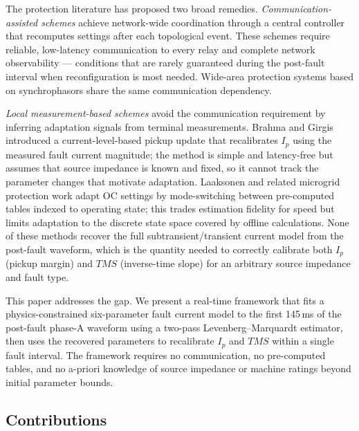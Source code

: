 \documentclass[journal, twoside, 10pt]{IEEEtran}
\begin{document}
The protection literature has proposed two broad remedies.
\emph{Communication-assisted schemes} \cite{Oudalov2009,Saleh2017} achieve
network-wide coordination through a central controller that recomputes settings
after each topological event.  These schemes require reliable, low-latency
communication to every relay and complete network observability --- conditions
that are rarely guaranteed during the post-fault interval when reconfiguration
is most needed.  Wide-area protection systems based on synchrophasors
\cite{Kundur1994} share the same communication dependency.

\emph{Local measurement-based schemes} avoid the communication requirement by
inferring adaptation signals from terminal measurements.  Brahma and Girgis
\cite{Brahma2004} introduced a current-level-based pickup update that recalibrates
$I_p$ using the measured fault current magnitude; the method is simple and
latency-free but assumes that source impedance is known and fixed, so it cannot
track the parameter changes that motivate adaptation.  Laaksonen
\cite{Laaksonen2017} and related microgrid protection work adapt OC settings
by mode-switching between pre-computed tables indexed to operating state; this
trades estimation fidelity for speed but limits adaptation to the discrete
state space covered by offline calculations.  None of these methods recover the
full subtransient/transient current model from the post-fault waveform, which
is the quantity needed to correctly calibrate both $I_p$ (pickup margin) and
$TMS$ (inverse-time slope) for an arbitrary source impedance and fault type.

This paper addresses the gap.  We present a real-time framework that fits
a physics-constrained six-parameter fault current model to the first
145\,ms of the post-fault phase-A waveform using a two-pass
Levenberg--Marquardt estimator, then uses the recovered parameters to
recalibrate $I_p$ and $TMS$ within a single fault interval.  The framework
requires no communication, no pre-computed tables, and no a-priori knowledge
of source impedance or machine ratings beyond initial parameter bounds.

\subsection*{Contributions}
\end{document}
